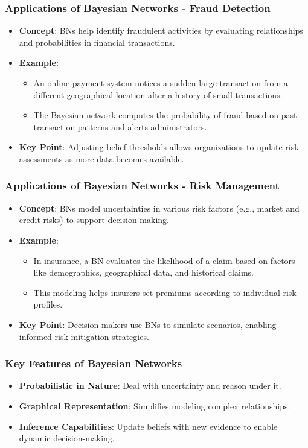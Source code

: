 \documentclass[aspectratio=169]{beamer}
\begin{document}
\begin{frame}
    \frametitle{Applications of Bayesian Networks - Fraud Detection}
    \begin{itemize}
        \item \textbf{Concept}: BNs help identify fraudulent activities by evaluating relationships and probabilities in financial transactions.
        \item \textbf{Example}: 
        \begin{itemize}
            \item An online payment system notices a sudden large transaction from a different geographical location after a history of small transactions.
            \item The Bayesian network computes the probability of fraud based on past transaction patterns and alerts administrators.
        \end{itemize}
        \item \textbf{Key Point}: Adjusting belief thresholds allows organizations to update risk assessments as more data becomes available.
    \end{itemize}
\end{frame}

\begin{frame}
    \frametitle{Applications of Bayesian Networks - Risk Management}
    \begin{itemize}
        \item \textbf{Concept}: BNs model uncertainties in various risk factors (e.g., market and credit risks) to support decision-making.
        \item \textbf{Example}: 
        \begin{itemize}
            \item In insurance, a BN evaluates the likelihood of a claim based on factors like demographics, geographical data, and historical claims.
            \item This modeling helps insurers set premiums according to individual risk profiles.
        \end{itemize}
        \item \textbf{Key Point}: Decision-makers use BNs to simulate scenarios, enabling informed risk mitigation strategies.
    \end{itemize}
\end{frame}

\begin{frame}
    \frametitle{Key Features of Bayesian Networks}
    \begin{itemize}
        \item \textbf{Probabilistic in Nature}: Deal with uncertainty and reason under it.
        \item \textbf{Graphical Representation}: Simplifies modeling complex relationships.
        \item \textbf{Inference Capabilities}: Update beliefs with new evidence to enable dynamic decision-making.
    \end{itemize}
\end{frame}
\end{document}
